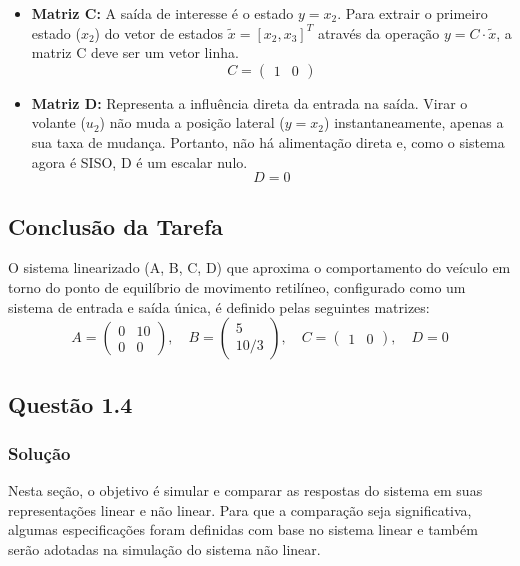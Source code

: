 \documentclass[a4paper,11pt]{article}
\begin{document}
\begin{itemize}
    \item \textbf{Matriz C:} A saída de interesse é o estado $y = x_2$. Para extrair o primeiro estado ($x_2$) do vetor de estados $\tilde{x} = [x_2, x_3]^T$ através da operação $y = C \cdot \tilde{x}$, a matriz C deve ser um vetor linha.
    \begin{equation}
        C = \begin{pmatrix} 1 & 0 \end{pmatrix}
    \end{equation}

    \item \textbf{Matriz D:} Representa a influência direta da entrada na saída. Virar o volante ($u_2$) não muda a posição lateral ($y=x_2$) instantaneamente, apenas a sua taxa de mudança. Portanto, não há alimentação direta e, como o sistema agora é SISO, D é um escalar nulo.
    \begin{equation}
        D = 0
    \end{equation}
\end{itemize}

\subsection*{Conclusão da Tarefa}
O sistema linearizado (A, B, C, D) que aproxima o comportamento do veículo em torno do ponto de equilíbrio de movimento retilíneo, configurado como um sistema de entrada e saída única, é definido pelas seguintes matrizes:
$$ A = \begin{pmatrix} 0 & 10 \\ 0 & 0 \end{pmatrix}, \quad B = \begin{pmatrix} 5 \\ 10/3 \end{pmatrix}, \quad C = \begin{pmatrix} 1 & 0 \end{pmatrix}, \quad D = 0 $$

\subsection*{\sc Questão 1.4}

\subsubsection*{\sc Solução}

Nesta seção, o objetivo é simular e comparar as respostas do sistema em suas representações linear e não linear. Para que a comparação seja significativa, algumas especificações foram definidas com base no sistema linear e também serão adotadas na simulação do sistema não linear.
\end{document}
